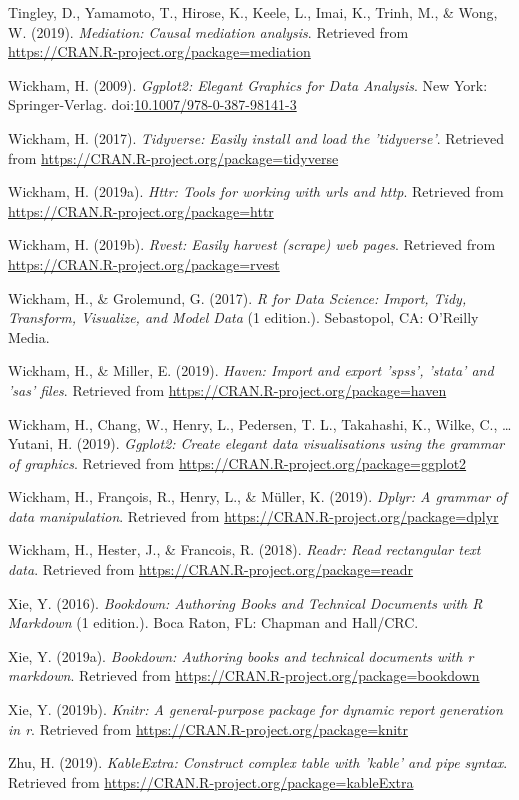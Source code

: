 \documentclass[doc,floatsintext]{apa6}
\begin{document}
\hypertarget{ref-R-mediation}{}
Tingley, D., Yamamoto, T., Hirose, K., Keele, L., Imai, K., Trinh, M.,
\& Wong, W. (2019). \emph{Mediation: Causal mediation analysis}.
Retrieved from \url{https://CRAN.R-project.org/package=mediation}

\hypertarget{ref-wickhamGgplot2ElegantGraphics2009}{}
Wickham, H. (2009). \emph{Ggplot2: Elegant Graphics for Data Analysis}.
New York: Springer-Verlag.
doi:\href{https://doi.org/10.1007/978-0-387-98141-3}{10.1007/978-0-387-98141-3}

\hypertarget{ref-R-tidyverse}{}
Wickham, H. (2017). \emph{Tidyverse: Easily install and load the
'tidyverse'}. Retrieved from
\url{https://CRAN.R-project.org/package=tidyverse}

\hypertarget{ref-R-httr}{}
Wickham, H. (2019a). \emph{Httr: Tools for working with urls and http}.
Retrieved from \url{https://CRAN.R-project.org/package=httr}

\hypertarget{ref-R-rvest}{}
Wickham, H. (2019b). \emph{Rvest: Easily harvest (scrape) web pages}.
Retrieved from \url{https://CRAN.R-project.org/package=rvest}

\hypertarget{ref-WickhamDataScienceImport2017}{}
Wickham, H., \& Grolemund, G. (2017). \emph{R for Data Science: Import,
Tidy, Transform, Visualize, and Model Data} (1 edition.). Sebastopol,
CA: O'Reilly Media.

\hypertarget{ref-R-haven}{}
Wickham, H., \& Miller, E. (2019). \emph{Haven: Import and export
'spss', 'stata' and 'sas' files}. Retrieved from
\url{https://CRAN.R-project.org/package=haven}

\hypertarget{ref-R-ggplot2}{}
Wickham, H., Chang, W., Henry, L., Pedersen, T. L., Takahashi, K.,
Wilke, C., \ldots{} Yutani, H. (2019). \emph{Ggplot2: Create elegant
data visualisations using the grammar of graphics}. Retrieved from
\url{https://CRAN.R-project.org/package=ggplot2}

\hypertarget{ref-R-dplyr}{}
Wickham, H., François, R., Henry, L., \& Müller, K. (2019). \emph{Dplyr:
A grammar of data manipulation}. Retrieved from
\url{https://CRAN.R-project.org/package=dplyr}

\hypertarget{ref-R-readr}{}
Wickham, H., Hester, J., \& Francois, R. (2018). \emph{Readr: Read
rectangular text data}. Retrieved from
\url{https://CRAN.R-project.org/package=readr}

\hypertarget{ref-xieBookdownAuthoringBooks2016}{}
Xie, Y. (2016). \emph{Bookdown: Authoring Books and Technical Documents
with R Markdown} (1 edition.). Boca Raton, FL: Chapman and Hall/CRC.

\hypertarget{ref-R-bookdown}{}
Xie, Y. (2019a). \emph{Bookdown: Authoring books and technical documents
with r markdown}. Retrieved from
\url{https://CRAN.R-project.org/package=bookdown}

\hypertarget{ref-R-knitr}{}
Xie, Y. (2019b). \emph{Knitr: A general-purpose package for dynamic
report generation in r}. Retrieved from
\url{https://CRAN.R-project.org/package=knitr}

\hypertarget{ref-R-kableExtra}{}
Zhu, H. (2019). \emph{KableExtra: Construct complex table with 'kable'
and pipe syntax}. Retrieved from
\url{https://CRAN.R-project.org/package=kableExtra}

\endgroup
\end{document}
